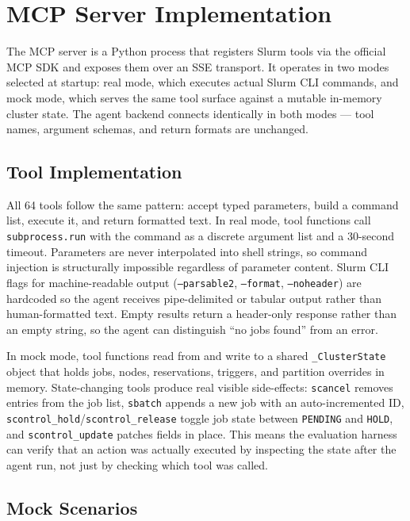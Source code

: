 \section{MCP Server Implementation}
\label{sec:mcp-implementation}

The MCP server is a Python process that registers Slurm tools via the official MCP SDK and exposes them over an SSE transport. It operates in two modes selected at startup: real mode, which executes actual Slurm CLI commands, and mock mode, which serves the same tool surface against a mutable in-memory cluster state. The agent backend connects identically in both modes — tool names, argument schemas, and return formats are unchanged.

\subsection{Tool Implementation}

All 64 tools follow the same pattern: accept typed parameters, build a command list, execute it, and return formatted text. In real mode, tool functions call \texttt{subprocess.run} with the command as a discrete argument list and a 30-second timeout. Parameters are never interpolated into shell strings, so command injection is structurally impossible regardless of parameter content. Slurm CLI flags for machine-readable output (\texttt{--parsable2}, \texttt{--format}, \texttt{--noheader}) are hardcoded so the agent receives pipe-delimited or tabular output rather than human-formatted text. Empty results return a header-only response rather than an empty string, so the agent can distinguish ``no jobs found'' from an error.

In mock mode, tool functions read from and write to a shared \texttt{\_ClusterState} object that holds jobs, nodes, reservations, triggers, and partition overrides in memory. State-changing tools produce real visible side-effects: \texttt{scancel} removes entries from the job list, \texttt{sbatch} appends a new job with an auto-incremented ID, \texttt{scontrol\_hold}/\texttt{scontrol\_release} toggle job state between \texttt{PENDING} and \texttt{HOLD}, and \texttt{scontrol\_update} patches fields in place. This means the evaluation harness can verify that an action was actually executed by inspecting the state after the agent run, not just by checking which tool was called.

\subsection{Mock Scenarios}


